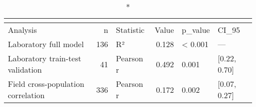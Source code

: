 \begin{longtable}{lrlrll}
\caption*{
{\large }
} \\ 
\toprule
Analysis & n & Statistic & Value & p\_value & CI\_95 \\ 
\midrule\addlinespace[2.5pt]
Laboratory full model & 136 & R² & 0.128 & < 0.001 & — \\ 
Laboratory train-test validation & 41 & Pearson r & 0.492 & 0.001 & [0.22, 0.70] \\ 
Field cross-population correlation & 336 & Pearson r & 0.172 & 0.002 & [0.07, 0.27] \\ 
\bottomrule
\end{longtable}


